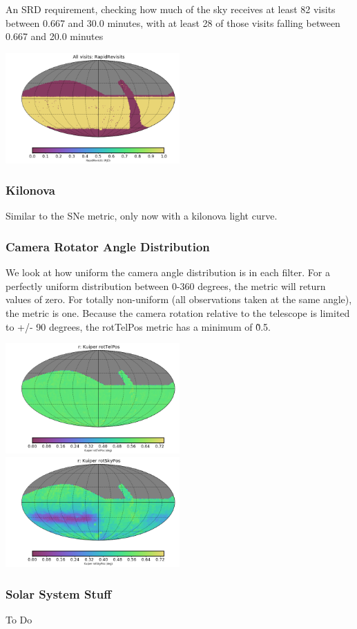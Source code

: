 {An SRD requirement, checking how much of the sky receives at least 82 visits between 0.667 and 30.0 minutes, with at least 28 of those visits falling between 0.667 and 20.0 minutes

\includegraphics[width=0.5\textwidth]{metric_summary/sci_baseline_v1.4_10yrs/thumb._RapidRevisits_All_visits_HEAL_SkyMap.png}

\subsubsection{Kilonova}

Similar to the SNe metric, only now with a kilonova light curve.

\subsubsection{Camera Rotator Angle Distribution}

We look at how uniform the camera angle distribution is in each filter. For a perfectly uniform distribution between 0-360 degrees, the metric will return values of zero. For totally non-uniform (all observations taken at the same angle), the metric is one.  Because the camera rotation relative to the telescope is limited to +/- 90 degrees, the rotTelPos metric has a minimum of \~0.5. 

\includegraphics[width=0.5\textwidth]{metric_summary/sci_baseline_v1.4_10yrs/thumb._Kuiper_rotTelPos_r_HEAL_SkyMap.png}
\includegraphics[width=0.5\textwidth]{metric_summary/sci_baseline_v1.4_10yrs/thumb._Kuiper_rotSkyPos_r_HEAL_SkyMap.png}


\subsubsection{Solar System Stuff}

To Do


}
